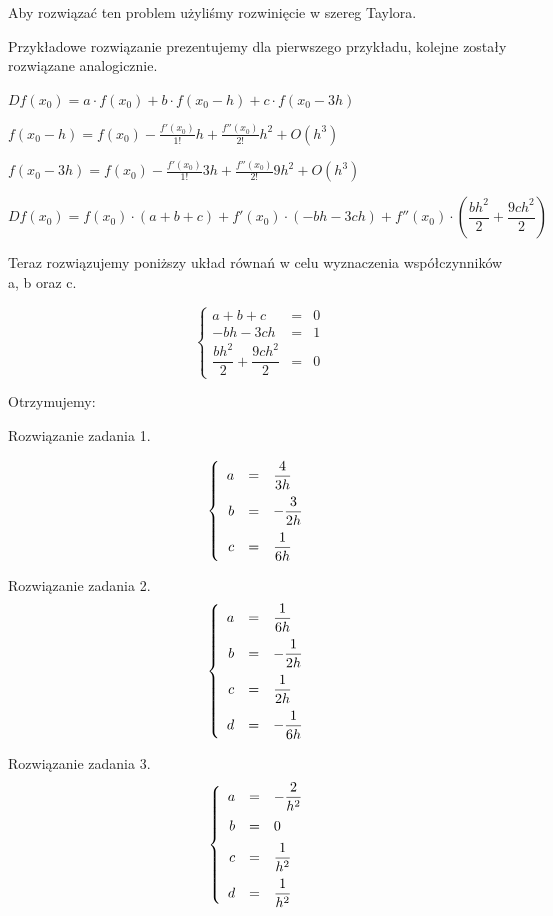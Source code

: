 Aby rozwiązać ten problem użyliśmy rozwinięcie w szereg Taylora.

Przykładowe rozwiązanie prezentujemy dla pierwszego przykładu, kolejne zostały rozwiązane analogicznie.

\vspace{0,5cm}


$Df(x_{0}) = a \cdot f(x_{0}) + b \cdot f(x_{0}-h) + c \cdot f(x_{0}-3h) $

$f(x_{0}-h) = f(x_{0}) - \frac{f'(x_{0})}{1!}h + \frac{f''(x_{0})}{2!}h^2 + O(h^3)$

$f(x_{0}-3h) = f(x_{0}) - \frac{f'(x_{0})}{1!}3h + \frac{f''(x_{0})}{2!}9h^2 + O(h^3)$

$Df(x_{0}) = f(x_{0}) \cdot (a+b+c) + f'(x_{0}) \cdot (-bh-3ch) + f''(x_{0}) \cdot (\dfrac{bh^2}{2} + \dfrac{9ch^2}{2}) $

Teraz rozwiązujemy poniższy układ równań w celu wyznaczenia współczynników a, b oraz c.

$$\left\{\begin{array}{rcl}
a+b+c&=&0\\
-bh-3ch&=&1\\
\dfrac{bh^2}{2} + \dfrac{9ch^2}{2}&=&0
\end{array} \right.$$

Otrzymujemy:

Rozwiązanie zadania 1.

$$\left\{\begin{array}{rcl}
\vspace{0.2cm}
a&=&\dfrac{4}{3h}\\
\vspace{0.2cm}
b&=&-\dfrac{3}{2h}\\
c&=&\dfrac{1}{6h}
\end{array} \right.$$


Rozwiązanie zadania 2.
$$\left\{\begin{array}{rcl}
\vspace{0.2cm}
a&=&\dfrac{1}{6h}\\
\vspace{0.2cm}
b&=&-\dfrac{1}{2h}\\
\vspace{0.2cm}
c&=&\dfrac{1}{2h} \\
d&=&-\dfrac{1}{6h}
\end{array} \right.$$

Rozwiązanie zadania 3.
$$\left\{\begin{array}{rcl}
\vspace{0.2cm}
a&=&-\dfrac{2}{h^2}\\
\vspace{0.2cm}
b&=&0\\
\vspace{0.2cm}
c&=&\dfrac{1}{h^2} \\
d&=&\dfrac{1}{h^2}
\end{array} \right.$$

